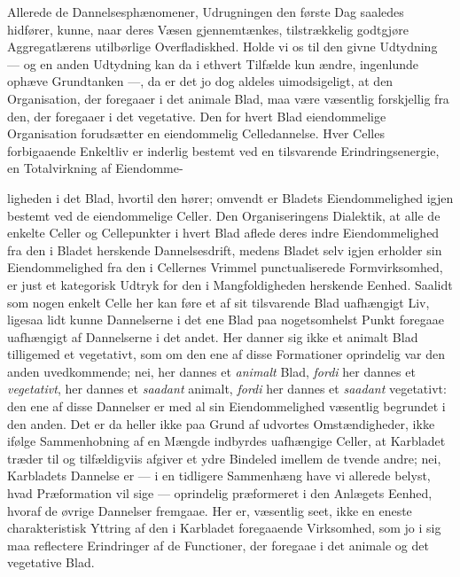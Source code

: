 \documentclass[12pt,a4paper]{book}
\begin{document}
Allerede de Dannelsesphænomener, Udrugningen den første Dag saaledes
hidfører, kunne, naar deres Væsen gjennemtænkes, tilstrækkelig godtgjøre
Aggregatlærens utilbørlige Overfladiskhed. Holde vi os til den givne
Udtydning --- og en anden Udtydning kan da i ethvert Tilfælde kun ændre,
ingenlunde ophæve Grundtanken ---, da er det jo dog aldeles uimodsigeligt,
at den Organisation, der foregaaer i det animale Blad, maa være væsentlig
forskjellig fra den, der foregaaer i det vegetative. Den for hvert Blad
eiendommelige Organisation forudsætter en eiendommelig Celledannelse.
Hver Celles forbigaaende Enkeltliv er inderlig bestemt ved en tilsvarende
Erindringsenergie, en Totalvirkning af Eiendomme-

ligheden i det Blad, hvortil den hører; omvendt er Bladets
Eiendommelighed igjen bestemt ved de eiendommelige Celler. Den
Organiseringens Dialektik, at alle de enkelte Celler og Cellepunkter i
hvert Blad aflede deres indre Eiendommelighed fra den i Bladet herskende
Dannelsesdrift, medens Bladet selv igjen erholder sin Eiendommelighed fra
den i Cellernes Vrimmel punctualiserede Formvirksomhed, er just et
kategorisk Udtryk for den i Mangfoldigheden herskende Eenhed. Saalidt som
nogen enkelt Celle her kan føre et af sit tilsvarende Blad uafhængigt
Liv, ligesaa lidt kunne Dannelserne i det ene Blad paa nogetsomhelst
Punkt foregaae uafhængigt af Dannelserne i det andet. Her danner sig ikke
et animalt Blad tilligemed et vegetativt, som om den ene af disse
Formationer oprindelig var den anden uvedkommende; nei, her dannes et
\emph{animalt} Blad, \emph{fordi} her dannes et \emph{vegetativt}, her
dannes et \emph{saadant} animalt, \emph{fordi} her dannes et
\emph{saadant} vegetativt: den ene af disse Dannelser er med al sin
Eiendommelighed væsentlig begrundet i den anden. Det er da heller ikke
paa Grund af udvortes Omstændigheder, ikke ifølge Sammenhobning af en
Mængde indbyrdes uafhængige Celler, at Karbladet træder til og
tilfældigviis afgiver et ydre Bindeled imellem de tvende andre; nei,
Karbladets Dannelse er --- i en tidligere Sammenhæng have vi allerede
belyst, hvad Præformation vil sige --- oprindelig præformeret i den
Anlægets Eenhed, hvoraf de øvrige Dannelser fremgaae. Her er, væsentlig
seet, ikke en eneste charakteristisk Yttring af den i Karbladet
foregaaende Virksomhed, som jo i sig maa reflectere Erindringer af de
Functioner, der foregaae i det animale og det vegetative Blad.
\end{document}
